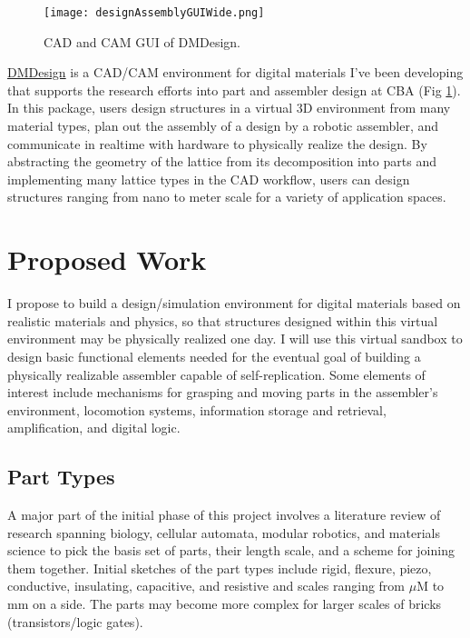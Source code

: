 {\begin{figure}
  \texttt{[image: designAssemblyGUIWide.png]}
  \caption{CAD and CAM GUI of DMDesign.}
  \label{fig: designAssemblyGUIWide}
\end{figure}
\href{http://dma.cba.mit.edu/dmdesign/}{DMDesign} is a CAD/CAM environment for digital materials I've been developing that supports the research efforts into part and assembler design at CBA (Fig \ref{fig: designAssemblyGUIWide}).  In this package, users design structures in a virtual 3D environment from many material types, plan out the assembly of a design by a robotic assembler, and communicate in realtime with hardware to physically realize the design.  By abstracting the geometry of the lattice from its decomposition into parts and implementing many lattice types in the CAD workflow, users can design structures ranging from nano to meter scale for a variety of application spaces.



\section{Proposed Work}

I propose to build a design/simulation environment for digital materials based on realistic materials and physics, so that structures designed within this virtual environment may be physically realized one day.  I will use this virtual sandbox to design basic functional elements needed for the eventual goal of building a physically realizable assembler capable of self-replication.  Some elements of interest include mechanisms for grasping and moving parts in the assembler's environment, locomotion systems, information storage and retrieval, amplification, and digital logic.

\subsection{Part Types}

A major part of the initial phase of this project involves a literature review of research spanning biology, cellular automata, modular robotics, and materials science to pick the basis set of parts, their length scale, and a scheme for joining them together.  Initial sketches of the part types include rigid, flexure, piezo, conductive, insulating, capacitive, and resistive and scales ranging from $\mu$M to mm on a side.  The parts may become more complex for larger scales of bricks (transistors/logic gates).

}
